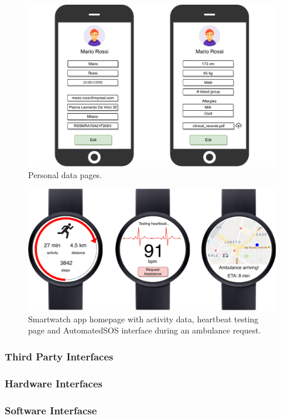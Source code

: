 \documentclass[12pt,a4paper]{article}
\begin{document}
		        \begin{figure}[H]
		        	\centering
		        	\includegraphics[width=1.0\linewidth]{Images/data-pages}
		        	\caption{Personal data pages.}
		        	\label{fig:data-pages}
		        \end{figure}
	            \begin{figure}[h]
				 	\centering
				 	\includegraphics[width=1.0\linewidth]{Images/smartwatch}
				 	\caption{Smartwatch app homepage with activity data, heartbeat testing page and AutomatedSOS interface during an ambulance request.}
				 	\label{fig:smartwatch}
				 \end{figure}
			\newpage
			\subsubsection{Third Party Interfaces}
			\newpage
			\subsubsection{Hardware Interfaces}
			\subsubsection{Software Interfacse}
\end{document}
